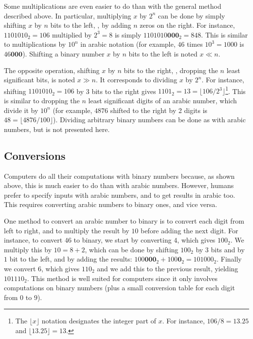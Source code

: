 Some multiplications are even easier to do than with the general method
described above. In particular, multiplying $x$ by $2^n$ can be done by simply
shifting $x$ by $n$ bits to the left, \ie, by adding $n$ zeros on the right.
For instance, $1101010_2=106$ multiplied by $2^3=8$ is simply
$1101010\mathbf{000}_2=848$. This is similar to multiplications by $10^n$ in
arabic notation (for example, $46$ times $10^3=1000$ is $46\mathbf{000}$).
Shifting a binary number $x$ by $n$ bits to the left is noted $x \ll n$.

The opposite operation, shifting $x$ by $n$ bits to the right, \ie, dropping
the $n$ least significant bits, is noted $x \gg n$. It corresponds to dividing
$x$ by $2^n$. For instance, shifting $1101010_2=106$ by 3 bits to the right
gives $1101_2=13=\lfloor 106 / 2^3 \rfloor$\footnote{The $\lfloor x \rfloor$
notation designates the integer part of $x$. For instance, $106 / 8 = 13.25$
and $\lfloor 13.25 \rfloor = 13$.}. This is similar to dropping the $n$ least
significant digits of an arabic number, which divide it by $10^n$ (for example,
$4876$ shifted to the right by 2 digits is $48=\lfloor 4876 / 100 \rfloor$).
Dividing arbitrary binary numbers can be done as with arabic numbers, but is
not presented here.

\subsection{Conversions}

Computers do all their computations with binary numbers because, as shown
above, this is much easier to do than with arabic numbers. However, humans
prefer to specify inputs with arabic numbers, and to get results in arabic too.
This requires converting arabic numbers to binary ones, and vice versa.

One method to convert an arabic number to binary is to convert each digit from
left to right, and to multiply the result by $10$ before adding the next digit.
For instance, to convert $46$ to binary, we start by converting $4$, which
gives $100_2$. We multiply this by $10=8+2$, which can be done by shifting
$100_2$ by $3$ bits and by $1$ bit to the left, and by adding the results:
$100\mathbf{000}_2+100\mathbf{0}_2=101000_2$. Finally we convert $6$, which
gives $110_2$ and we add this to the previous result, yielding $101110_2$. This
method is well suited for computers since it only involves computations on
binary numbers (plus a small conversion table for each digit from $0$ to $9$).

